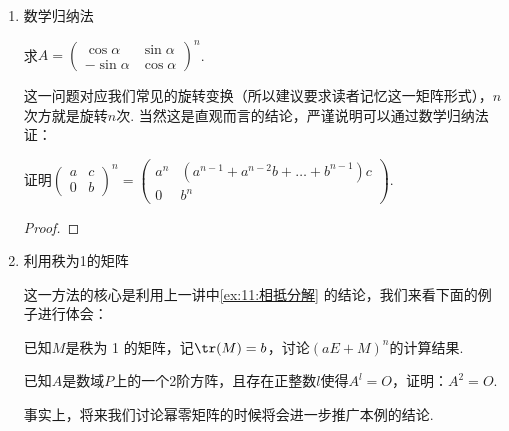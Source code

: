 \begin{enumerate}
          \begin{solution}

          \end{solution}

    \item 数学归纳法
          \begin{example}
              求$A=\begin{pmatrix}\cos\alpha & \sin\alpha \\ -\sin\alpha & \cos\alpha\end{pmatrix}^n$.
          \end{example}
          这一问题对应我们常见的旋转变换（所以建议要求读者记忆这一矩阵形式），$n$次方就是旋转$n$次. 当然这是直观而言的结论，严谨说明可以通过数学归纳法证：

          \begin{solution}

          \end{solution}

          \begin{example}
              证明$\begin{pmatrix}
                      a & c \\ 0 & b
                  \end{pmatrix}^n=\begin{pmatrix}
                      a^n & (a^{n-1}+a^{n-2}b+\dots+b^{n-1})c \\ 0 & b^n
                  \end{pmatrix}$.
          \end{example}
          \begin{proof}

          \end{proof}

    \item 利用秩为1的矩阵

          这一方法的核心是利用上一讲中\autoref{ex:11:相抵分解} 的结论，我们来看下面的例子进行体会：
          \begin{example}
              已知$M$是秩为 1 的矩阵，记$\tr(M)=b$，讨论$(aE+M)^n$的计算结果.
          \end{example}
          \begin{solution}

          \end{solution}

          \begin{example}
              已知$A$是数域$P$上的一个2阶方阵，且存在正整数$l$使得$A^l=O$，证明：$A^2=O$.
          \end{example}
          事实上，将来我们讨论幂零矩阵的时候将会进一步推广本例的结论.


\end{enumerate}
